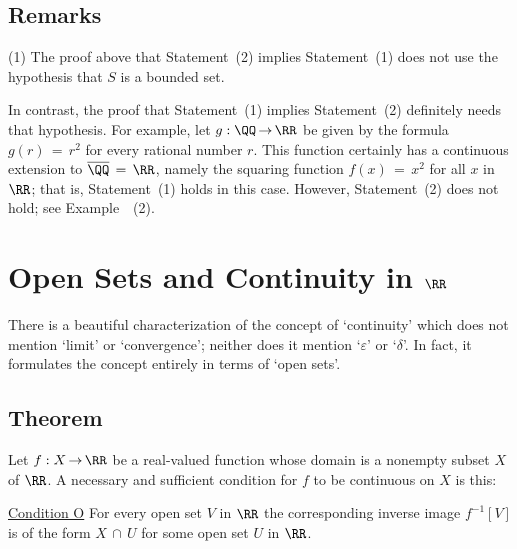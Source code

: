 \V

             \subsection{\small{\bf Remarks}}
            \label{RemrkF20.130}   

\V

\hspace*{\parindent}(1) The proof above that Statement~(2) implies Statement~(1) does not use the hypothesis that $S$ is a bounded set.

        In contrast, the proof that Statement~(1) implies Statement~(2) definitely needs that hypothesis.
    For example, let $g:{\QQ} \,{\rightarrow}\, {\RR}$ be given by the formula $g(r) \,=\, r^{2}$ for every rational number $r$.
    This function certainly has a continuous extension to $\overline{{\QQ}} \,=\, {\RR}$, namely the squaring function $f(x) \,=\, x^{2}$ for all $x$ in ${\RR}$;
    that is, Statement~(1) holds in this case.
    However, Statement~(2) does not hold; see Example~~(2).

\V
\V

                \section{{\bf Open Sets and Continuity in ${\RR}$}}
                \label{SectF30}

\V
\V

        There is a beautiful characterization of the concept of `continuity' which does not mention `limit' or `convergence';
    neither does it mention `${\varepsilon}$' or `${\delta}$'.
    In fact, it formulates the concept entirely in terms of `open sets'.

\V

             \subsection{\small{\bf Theorem}}
            \label{ThmF30.20}

\V

        Let $f:X \,{\rightarrow}\, {\RR}$ be a real-valued function whose domain is a nonempty subset $X$ of ${\RR}$.
    A necessary and sufficient condition for $f$ to be continuous on $X$ is this:

     \h \underline{Condition O} For every open set $V$ in ${\RR}$ the corresponding inverse image $f^{-1}[V]$ is of the form $X\,{\cap}\,U$ for some open set $U$ in ${\RR}$.

